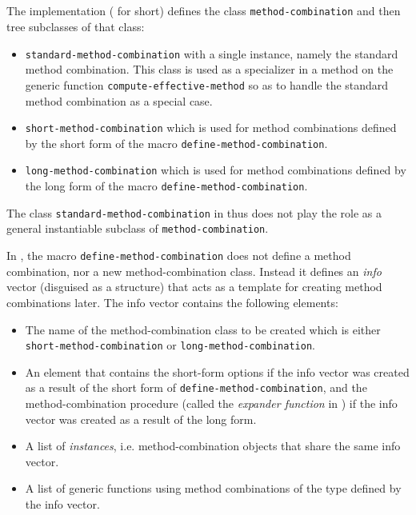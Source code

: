 \subsection{\clcl{}}
\label{sec-ccl}

The \clcl{} implementation (\ccl{} for short) defines the class
\texttt{method-combination} and then tree subclasses of that class:

\begin{itemize}
\item \texttt{standard-method-combination} with a single instance,
  namely the standard method combination.  This class is used as a
  specializer in a method on the generic function
  \texttt{compute-effective-method} so as to handle the standard
  method combination as a special case.
\item \texttt{short-method-combination} which is used for method
  combinations defined by the short form of the macro
  \texttt{define-method-combination}.
\item \texttt{long-method-combination} which is used for method
  combinations defined by the long form of the macro
  \texttt{define-method-combination}.
\end{itemize}

The class \texttt{standard-method-combination} in \ccl{} thus does not
play the role as a general instantiable subclass of
\texttt{method-combination}.

In \ccl{}, the macro \texttt{define-method-combination} does not
define a method combination, nor a new method-combination class.
Instead it defines an \emph{info} vector (disguised as a structure)
that acts as a template for creating method combinations later.  The
info vector contains the following elements:

\begin{itemize}
\item The name of the method-combination class to be created which is
  either \texttt{short-method-combination} or
  \texttt{long-method-combination}.
\item An element that contains the short-form options if the info
  vector was created as a result of the short form of
  \texttt{define-method-combination}, and the method-combination
  procedure (called the \emph{expander function} in \ccl{}) if the
  info vector was created as a result of the long form.
\item A list of \emph{instances}, i.e. method-combination objects that
  share the same info vector.
\item A list of generic functions using method combinations of the
  type defined by the info vector.
\end{itemize}

